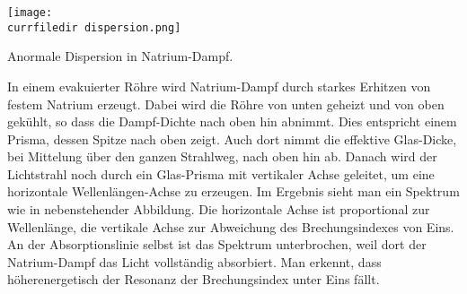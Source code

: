 \begin{marginfigure}
\texttt{[image: \\currfiledir dispersion.png]}
\caption{Anormale Dispersion in Natrium-Dampf. }
\end{marginfigure}


In einem evakuierter Röhre wird Natrium-Dampf durch starkes Erhitzen von festem Natrium erzeugt.  Dabei wird die Röhre von unten geheizt und von oben gekühlt, so dass die Dampf-Dichte nach oben hin abnimmt. Dies entspricht einem Prisma, dessen Spitze nach oben zeigt. Auch dort nimmt die effektive Glas-Dicke, bei Mittelung über den ganzen Strahlweg, nach oben hin ab. Danach wird der Lichtstrahl noch durch ein Glas-Prisma mit vertikaler Achse geleitet, um  eine horizontale Wellenlängen-Achse zu erzeugen. Im Ergebnis sieht man ein Spektrum wie in nebenstehender Abbildung. Die horizontale Achse ist proportional zur Wellenlänge, die vertikale Achse zur Abweichung des Brechungsindexes von Eins. An der Absorptionslinie selbst ist das Spektrum unterbrochen, weil dort der Natrium-Dampf das Licht vollständig absorbiert. Man erkennt, dass höherenergetisch der Resonanz der Brechungsindex unter Eins fällt.




\printbibliography[segment=\therefsegment,heading=subbibliography]
